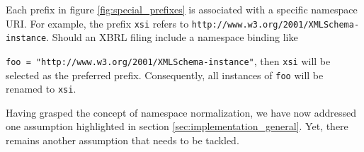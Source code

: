 Each prefix in figure \ref{fig:special_prefixes} is associated with a specific namespace URI.
For example, the prefix \texttt{xsi} refers to \texttt{http://www.w3.org/2001/XMLSchema-instance}\cite{w3_schema_instance}.
Should an XBRL filing include a namespace binding like 

\texttt{foo = "http://www.w3.org/2001/XMLSchema-instance"},
then \texttt{xsi} will be selected as the preferred prefix. Consequently, all instances of \texttt{foo} will be renamed to \texttt{xsi}.



Having grasped the concept of namespace normalization, we have now addressed one assumption highlighted in section \ref{sec:implementation_general}.
Yet, there remains another assumption that needs to be tackled.
